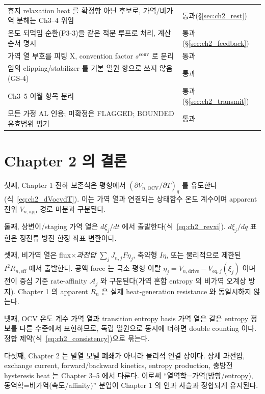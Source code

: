 \documentclass[11pt,a4paper]{article}
\newcommand{\eff}{\mathrm{eff}}
\newcommand{\eq}{\mathrm{eq}}
\newcommand{\app}{\mathrm{app}}
\newcommand{\drive}{\mathrm{drive}}
\newcommand{\OCV}{\mathrm{OCV}}
\newcommand{\conv}{\mathrm{conv}}
\begin{document}
{\begin{longtable}{p{} p{}}
휴지 relaxation heat 를 확정항 아닌 후보로, 가역/비가역 분해는 Ch3--4 위임 & 통과(\S\ref{sec:ch2_rest}) \\
온도 되먹임 순환(P3-3)을 같은 적분 루프로 처리, 계산 순서 명시 & 통과(\S\ref{sec:ch2_feedback}) \\
가역 열 부호를 피팅 X, convention factor $s^{\conv}$ 로 분리 & 통과 \\
임의 clipping/stabilizer 를 기본 열원 항으로 쓰지 않음(GS-4) & 통과 \\
Ch3--5 이월 항목 분리 & 통과(\S\ref{sec:ch2_transmit}) \\
모든 가정 AL 인용; 미확정은 FLAGGED; BOUNDED 유효범위 병기 & 통과 \\
\bottomrule
\end{longtable}
}

\section{Chapter 2 의 결론}\label{sec:ch2_concl}
첫째, Chapter 1 전하 보존식은 평형에서 $(\partial V_{n,\OCV}/\partial T)_q$ 를 유도한다(식~\eqref{eq:ch2_dVocvdT}).
이는 가역 열과 연결되는 상태함수 온도 계수이며 apparent 전위 $V_{n,\app}$ 경로 미분과 구분된다.

둘째, 상변이/staging 가역 열은 $d\xi_j/dt$ 에서 출발한다(식~\eqref{eq:ch2_revxi}). $d\xi_j/dq$ 표현은
정전류 방전 한정 좌표 변환이다.

셋째, 비가역 열은 flux$\times$\emph{과전압} $\sum_jJ_{n,j}F\eta_j$, 축약형 $I\eta$, 또는 물리적으로 제한된
$I^2R_{n,\eff}$ 에서 출발한다. 공액 force 는 국소 평형 이탈 $\eta_j=V_{n,\drive}-V_{\eq,j}(\xi_j)$ 이며
전이 중심 기준 rate-affinity $\mathcal A_j$ 와 구분된다(가역 혼합 entropy 의 비가역 오계상 방지). Chapter 1 의
apparent $R_n$ 은 실제 heat-generation resistance 와 동일시하지 않는다.

넷째, OCV 온도 계수 가역 열과 transition entropy basis 가역 열은 같은 entropy 정보를 다른 수준에서
표현하므로, 독립 열원으로 동시에 더하면 double counting 이다. 정합 제약(식~\eqref{eq:ch2_consistency})으로 묶는다.

다섯째, Chapter 2 는 발열 모델 폐쇄가 아니라 물리적 연결 장이다. 상세 과전압, exchange current,
forward/backward kinetics, entropy production, 충방전 hysteresis heat 는 Chapter 3--5 에서 다룬다. 이로써
``열역학=가역(방향/entropy), 동역학=비가역(속도/affinity)'' 분업이 Chapter 1 의 인과 사슬과 정합되게 유지된다.
\end{document}
